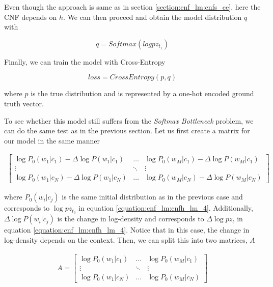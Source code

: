 Even though the approach is same as in section \ref{section:cnf_lm:cnfs_ce}, here the CNF depends on $ h $. We can then proceed and obtain the model distribution $ q $ with

\begin{displaymath}
    q = Softmax(log pz_{t_1})
\end{displaymath}

Finally, we can train the model with Cross-Entropy

\begin{displaymath}
    loss = CrossEntropy(p, q)
\end{displaymath}

where $ p $ is the true distribution and is represented by a one-hot encoded ground truth vector.

To see whether this model still suffers from the \emph{Softmax Bottleneck} problem, we can do the same test as in the previous section. Let us first create a matrix for our model in the same manner

\begin{displaymath}
    \begin{matrix}
    \begin{bmatrix}
       \log P_0(w_1 | c_1) - \Delta \log P(w_1| c_1) & \hdots & \log P_0(w_M | c_1) - \Delta \log P(w_M | c_1)  \\
       \vdots & \ddots & \vdots \\
       \log P_0(w_1 | c_N) - \Delta \log P(w_1| c_N) & \hdots & \log P_0(w_M | c_N) - \Delta \log P(w_M | c_N)
      \end{bmatrix}
    \end{matrix}
\end{displaymath}

where $ P_0(w_i | c_j) $ is the same initial distribution as in the previous case and corresponds to $ \log pz_{t_0} $ in equation \ref{equation:cnf_lm:cnfh_lm_4}. Additionally, $ \Delta \log P(w_i | c_j) $ is the change in log-density and corresponds to $ \Delta \log pz_t $ in equation \ref{equation:cnf_lm:cnfh_lm_4}. Notice that in this case, the change in log-density depends on the context. Then, we can split this into two matrices, $ A $

\begin{displaymath}
    \begin{matrix}
    A = \begin{bmatrix}
       \log P_0(w_1 | c_1) & \hdots & \log P_0(w_M | c_1) \\
       \vdots & \ddots & \vdots \\
       \log P_0(w_1 | c_N) & \hdots & \log P_0(w_M | c_N)
      \end{bmatrix}
    \end{matrix}
\end{displaymath}


